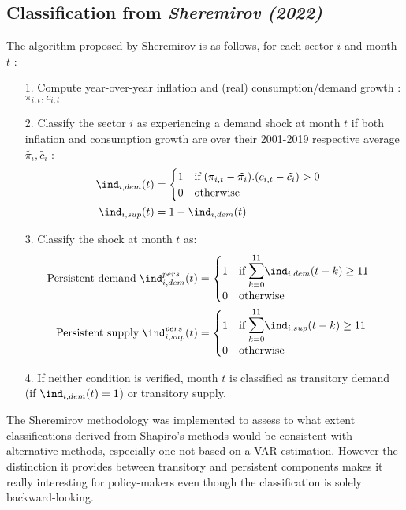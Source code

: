 \subsection{Classification from \textit{Sheremirov (2022)}}

\quad The algorithm proposed by Sheremirov is as follows, for each sector $i$ and month $t$ :
\begin{itemize}
    \item[1.] Compute year-over-year inflation and (real) consumption/demand growth : $\pi_{i,t},c_{i,t}$
    \item[2.]\label{sherem2} Classify the sector $i$ as experiencing a demand shock at month $t$ if both inflation and consumption growth are over their 2001-2019 respective average $\tilde{\pi_i},\tilde{c_i}$ : 
    \begin{align*}
        \ind_{i,dem}(t) &= \begin{cases} 1 \quad \textrm{if} \; (\pi_{i,t}-\tilde{\pi_i}).(c_{i,t}-\tilde{c_i})>0 \\ 0 \quad \textrm{otherwise} \end{cases} \\ 
        \ind_{i,sup}(t) &= 1 - \ind_{i,dem}(t)
    \end{align*}
    \item[3.] Classify the shock at month $t$ as:
    \begin{align*}
        \textrm{Persistent demand} \; \ind_{i,dem}^{pers}(t) &= \begin{cases} 1 \quad \textrm{if} \; \mathlarger{\mathlarger{\sum}}_{k=0}^{11} \ind_{i,dem}(t-k) \geq 11 \\ 0 \quad \textrm{otherwise} \end{cases} \\ 
        \textrm{Persistent supply} \; \ind_{i,sup}^{pers}(t) &= \begin{cases} 1 \quad \textrm{if} \; \mathlarger{\mathlarger{\sum}}_{k=0}^{11} \ind_{i,sup}(t-k) \geq 11 \\ 0 \quad \textrm{otherwise} \end{cases} \\ 
    \end{align*}
    \item[4.] If neither condition is verified, month $t$ is classified as transitory demand (if $\ind_{i,dem}(t)=1$) or transitory supply.
\end{itemize}
\quad The Sheremirov methodology was implemented to assess to what extent classifications derived from Shapiro's methods would be consistent with alternative methods, especially one not based on a VAR estimation. 
However the distinction it provides between transitory and persistent components makes it really interesting for policy-makers even though the classification is solely backward-looking.
\bigbreak

